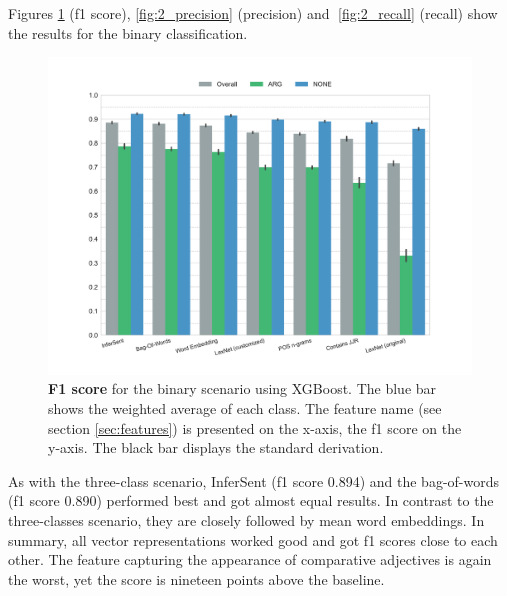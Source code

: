 Figures \ref{fig:2_f1} (f1 score), \ref{fig:2_precision} (precision) and \ref{fig:2_recall} (recall) show the results for the binary classification.
\begin{figure}[h]
      \caption{\textbf{F1 score} for the binary scenario using XGBoost. The blue bar shows the weighted average of each class. The feature name (see section \ref{sec:features}) is presented on the x-axis, the f1 score on the y-axis. The black bar displays the standard derivation.} 
    \label{fig:3_f1}

    \label{fig:2_f1}
 \centering
	\includegraphics[width=1\textwidth]{images/experiments/f1-True}

\end{figure}
As with the three-class scenario, InferSent (f1 score 0.894) and the bag-of-words (f1 score 0.890) performed best and got almost equal results. In contrast to the three-classes scenario, they are closely followed by mean word embeddings. In summary, all vector representations worked good and got f1 scores close to each other. The feature capturing the appearance of comparative adjectives is again the worst, yet the score is nineteen points above the baseline.



